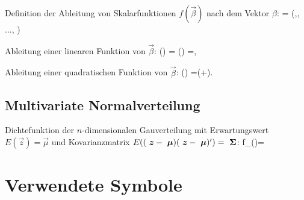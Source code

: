 \item Definition der Ableitung von Skalarfunktionen $f(\vec{\beta})$ nach dem
Vektor $\beta$:
\bdm
{}
 = \left(,, ...,
 \right)\tr
\edm

\item Ableitung einer linearen Funktion von $\vec{\beta}$:
\bdm
  \ablpart{}{\vec{\beta}} \left(\vec{\beta}\tr {}\right)
=\ablpart{}{\vec{\beta}} \left(\tr \vec{\beta}\right)
=,
\edm

\item Ableitung einer quadratischen Funktion von $\vec{\beta}$:
\bdm
  \ablpart{}{\vec{\beta}} \left(\vec{\beta}\tr {}\vec{\beta}\right)
=\left(+\tr \right)\vec{\beta}.
\edm
\ei

\subsection{\label{sec:matrixGauss}Multivariate Normalverteilung} 

Dichtefunktion der $n$-dimensionalen Gau\3verteilung mit
Erwartungswert $E(\vec{z})=\vec{\mu}$ und 
Kovarianzmatrix 
$E( ({\mbox{ \boldmath{$z$}}}-{\mbox{ \boldmath{$\mu$}}})({\mbox{ \boldmath{$z$}}}-{\mbox{ \boldmath{$\mu$}}})')={\mbox{ \boldmath{$\Sigma$}}}$:
\bdm
f_{}()=
 \exp {}
\edm


\newpage

\section{\label{symbolsRegr}Verwendete Symbole}

